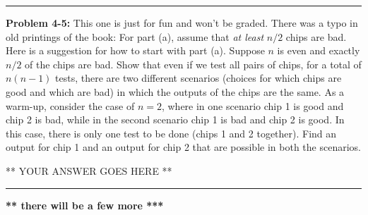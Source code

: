 \documentclass[12pt]{article}  %
\begin{document}
\rule{6in}{.1pt}       %

\noindent
{\bf Problem 4-5:}  This one is just for fun and won't be graded.
There was a typo in old printings of the book:  For part (a), assume
that {\em at least} $n/2$ chips are bad.
Here is a suggestion for how to start with part (a).  Suppose $n$ is
even and exactly $n/2$ of the chips are bad.
Show that even if we test all pairs of chips, for a total of $n(n-1)$ tests,
there are two different scenarios (choices for which chips are good
and which are bad) in which the outputs of the chips are the same.
As a warm-up, consider the case of $n=2$, where in one scenario
chip 1 is good and chip 2 is bad, while in the second scenario
chip 1 is bad and chip 2 is good.  In this case, there is only one test
to be done (chips 1 and 2 together).  Find an output for chip 1 and
an output for chip 2 that are possible in both the scenarios.

** YOUR ANSWER GOES HERE **

\rule{6in}{.1pt}       %

\noindent
{\bf *** there will be a few more ***}
\end{document}

